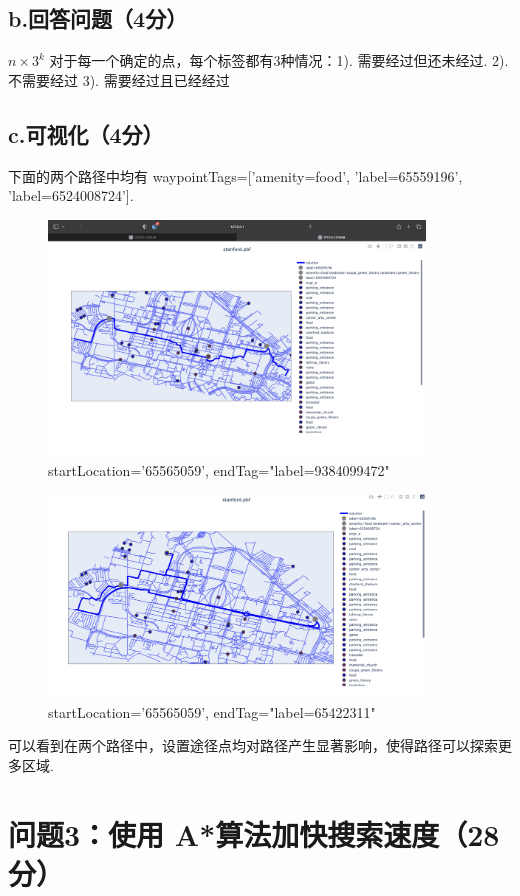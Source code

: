 \documentclass{article}
\begin{document}
\subsection*{b.回答问题（4分）}
$n\times 3^k$ 对于每一个确定的点，每个标签都有3种情况：1). 需要经过但还未经过. 2).不需要经过 3). 需要经过且已经经过 

\subsection*{c.可视化（4分）}
下面的两个路径中均有 waypointTags=['amenity=food', 'label=65559196', 'label=6524008724'].
\begin{figure}[H]
    \centering
    \includegraphics[width=10cm]{pics/waypoints_long.png}
    \caption{startLocation='65565059', endTag="label=9384099472"}
\end{figure}

\begin{figure}[H]
    \centering
    \includegraphics[width=10cm]{pics/waypoints_short.png}
    \caption{startLocation='65565059', endTag="label=65422311"}
\end{figure}

可以看到在两个路径中，设置途径点均对路径产生显著影响，使得路径可以探索更多区域.

\section*{问题3：使用 A*算法加快搜索速度（28分）}
\end{document}

